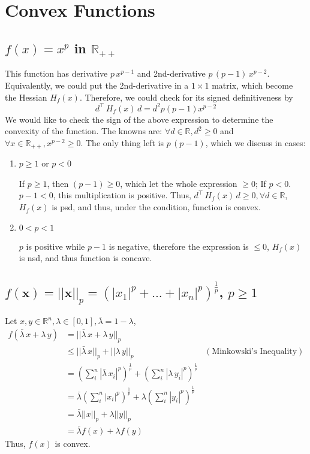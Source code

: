 



\section{Convex Functions}

\subsection{$f(x) = x^p$ in $\mathbb{R}_{++}$}

This function has derivative $p\,x^{p - 1}$ and 2nd-derivative $p\,(p - 1)\,x^{p - 2}$. Equivalently, we could put the 2nd-derivative in a $1\times 1$ matrix, which become the Hessian $H_f(x)$. Therefore, we could check for its signed definitiveness by
\[
d^\intercal\, H_f(x)\, d = d^2p(p - 1)x^{p - 2}
\]
We would like to check the sign of the above expression to determine the convexity of the function. The knowns are: $\forall d \in \mathbb{R}, d^2 \geq 0$ and $\forall x\in \mathbb{R}_{++}, x^{p - 2} \geq 0$. The only thing left is $p\,(p - 1)$, which we discuss in cases:
\begin{enumerate}
\item $p \geq 1$ or $p < 0$
\par If $p \geq 1$, then $(p - 1) \geq 0$, which let the whole expression $\geq 0$; If $p < 0$. $p - 1 <0$, this multiplication is positive. Thus, $d^\intercal\, H_f(x)\, d \geq 0, \forall d \in \mathbb{R}$, $H_f(x)$ is psd, and thus, under the condition, function is convex.
\item $0 < p < 1$
\par $p$ is positive while $p - 1$ is negative, therefore the expression is $\leq 0$, $H_f(x)$ is nsd, and thus function is concave.
\end{enumerate}

\subsection{$f(\mathbf{x})=||\mathbf{x}||_p = (|x_1|^p+...+|x_n|^p)^{\frac{1}{p}}$, $p\geq 1$}
Let $x, y \in \mathbb{R}^n, \lambda \in [0, 1], \bar{\lambda} = 1 - \lambda$,
\begin{align*}
f(\bar{\lambda}\,x + \lambda\,y) 
&= ||\bar{\lambda}\,x + \lambda\,y||_p & \\
&\leq ||\bar{\lambda}\,x||_p  + || \lambda\,y||_p & (\text{Minkowski's Inequality})\\
&= (\sum_i^n |\bar{\lambda}\,x_i|^p)^\frac{1}{p} + (\sum_i^n |\lambda\,y_i|^p)^\frac{1}{p} \\
&= \bar{\lambda}(\sum_i^n |x_i|^p)^\frac{1}{p} + \lambda(\sum_i^n |y_i|^p)^\frac{1}{p} \\
&= \bar{\lambda} ||x||_p + \lambda ||y||_p \\
&= \bar{\lambda} f(x) + \lambda f(y)
\end{align*}
Thus, $f(x)$ is convex.

